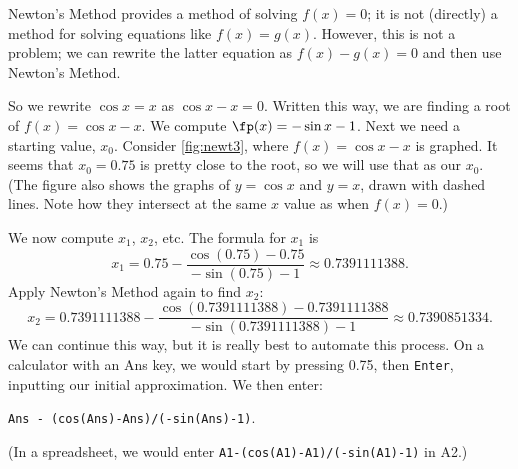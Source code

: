 {Newton's Method provides a method of solving $f(x) = 0$; it is not (directly) a method for solving equations like $f(x) = g(x)$. However, this is not a problem; we can rewrite the latter equation as $f(x) - g(x)=0$ and then use Newton's Method. 

So we rewrite $\cos x=x$ as $\cos{x}-x=0$.  Written this way, we are finding a root of $f(x)=\cos{x}-x$.  We compute $\fp(x)=-\sin{x} - 1$.  Next we need a starting value, $x_0$.  Consider \autoref{fig:newt3}, where $f(x) = \cos x-x$ is graphed. It seems that $x_0=0.75$ is pretty close to the root, so we will use that as our $x_0$. (The figure also shows the graphs of $y=\cos x$ and $y=x$, drawn with dashed lines. Note how they intersect at the same $x$ value as when $f(x) = 0$.)


We now compute $x_1$, $x_2$, etc.  The formula for $x_1$ is 
\[x_1 = 0.75 - \frac{\cos(0.75)-0.75}{-\sin(0.75)-1}\approx 0.7391111388.\]
Apply Newton's Method again to find $x_2$:
\[x_2 = 0.7391111388 - \frac{\cos(0.7391111388)-0.7391111388}{-\sin(0.7391111388)-1}\approx 0.7390851334.\]
We can continue this way, but it is really best to automate this process.  On a calculator with an Ans key, we would start by pressing 0.75, then \texttt{Enter}, inputting our initial approximation. We then enter:
\begin{center}\texttt{Ans - (cos(Ans)-Ans)/(-sin(Ans)-1)}.\end{center}
(In a spreadsheet, we would enter \texttt{A1-(cos(A1)-A1)/(-sin(A1)-1)} in A2.)

}
